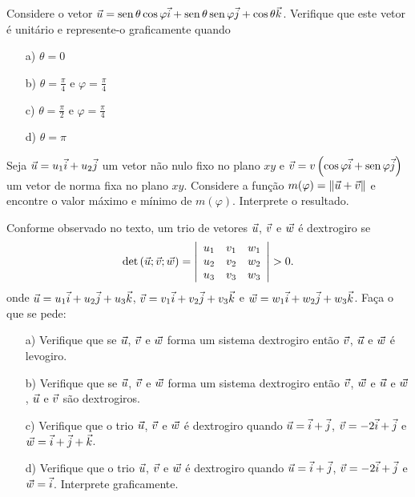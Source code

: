 \begin{exer} Considere o vetor $\vec{u}=\operatorname{sen}\theta \cos\varphi \vec{i}+ \operatorname{sen}\theta \operatorname{sen}\varphi \vec{j} + \cos\theta \vec{k}$. Verifique que este vetor é unitário e represente-o graficamente quando
\begin{itemize}
\item[a)] $\theta=0$
\item[b)] $\theta=\frac{\pi}{4}$ e $\varphi=\frac{\pi}{4}$
\item[c)] $\theta=\frac{\pi}{2}$ e $\varphi=\frac{\pi}{4}$
\item[d)] $\theta=\pi$

\end{itemize}
\end{exer}

\begin{exer}\label{probmaxmin} Seja $\vec{u}=u_1\vec{i} + u_2\vec{j}$ um vetor não nulo fixo no plano $xy$ e $\vec{v}=v\left(\cos\varphi \vec{i}+\operatorname{sen}\varphi \vec{j}\right)$ um vetor de norma fixa no plano $xy$. Considere a função $m(\varphi)=\|\vec{u}+\vec{v}\|$ e encontre o valor máximo e mínimo de $m(\varphi)$. Interprete o resultado.
\end{exer}

\begin{exer}\label{probdextro} Conforme observado no texto, um trio de vetores $\vec{u}$, $\vec{v}$ e $\vec{w}$ é dextrogiro se
\begin{equation*}
\det\left(\vct{u};\vct{v};\vct{w}\right)= \left|\begin{array}{ccc}
u_1&v_1&w_1\\
u_2&v_2&w_2\\
u_3&v_3&w_3
\end{array}
\right|>0.
\end{equation*}   
onde $\vec{u}=u_1\vec{i}+u_2\vec{j}+u_3\vec{k}$, $\vec{v}=v_1\vec{i}+v_2\vec{j}+v_3\vec{k}$ e $\vec{w}=w_1\vec{i}+w_2\vec{j}+w_3\vec{k}$. Faça o que se pede:
\begin{itemize}
\item [a)]Verifique que se $\vec{u}$, $\vec{v}$ e $\vec{w}$ forma um sistema dextrogiro então $\vec{v}$, $\vec{u}$ e $\vec{w}$ é levogiro.
\item [b)]Verifique que se $\vec{u}$, $\vec{v}$ e $\vec{w}$ forma um sistema dextrogiro então $\vec{v}$, $\vec{w}$ e $\vec{u}$ e $\vec{w}$, $\vec{u}$ e $\vec{v}$ são dextrogiros. 
\item [c)]Verifique que o trio $\vec{u}$, $\vec{v}$ e $\vec{w}$ é dextrogiro quando $\vec{u}=\vec{i}+\vec{j}$, $\vec{v}=-2\vec{i}+\vec{j}$ e $\vec{w}=\vec{i}+\vec{j}+\vec{k}$. 
\item [d)]Verifique que o trio $\vec{u}$, $\vec{v}$ e $\vec{w}$ é dextrogiro quando $\vec{u}=\vec{i}+\vec{j}$, $\vec{v}=-2\vec{i}+\vec{j}$ e $\vec{w}=\vec{i}$. Interprete graficamente.
\end{itemize}
\end{exer}

